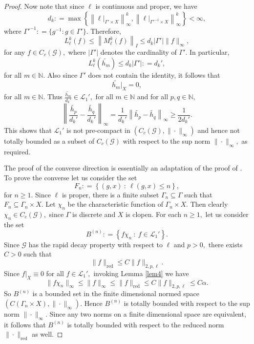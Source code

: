 \documentclass[a4paper,11pt,reqno]{amsart}
\theoremstyle{plain}
\theoremstyle{named}
\numberwithin{equation}{section}
\begin{document}
\begin{proof}
				Now note that since $\ell$ is continuous and proper, we have $$d_k : = \max \left \{\left \|\ell \rvert_{\Gamma' \times X} \right \|_{\infty}^k, \left \|\ell \rvert_{\Gamma'^{-1} \times X} \right \|_{\infty}^k \right \} < \infty,$$ where $\Gamma'^{-1} : = \{g^{-1} : g \in \Gamma' \}.$  Therefore, $$L_{\ell}^{k} (f) \leq \left \|M_{\ell}^{k} (f) \right \|_{I} \leq d_k \left \lvert \Gamma' \right \rvert \|f\|_{\infty},$$ for any $f \in C_c (\mathcal G),$ where $\left \lvert \Gamma' \right \rvert$ denotes the cardinality of $\Gamma'.$ In particular, $$L_{\ell}^{k} \left (\widetilde {h_m} \right ) \leq d_k \left \lvert \Gamma' \right \rvert : = d_k',$$ for all $m \in \mathbb N.$ Also since $\Gamma'$ does not contain the identity, it follows that $$\widetilde {h_m} \big \rvert_{X} = 0,$$ for all $m \in \mathbb N.$ Thus $\frac {\widetilde {h_m}} {d_k'} \in \mathcal L_1',$ for all $m \in \mathbb N$ and for all $p, q \in \mathbb N,$ $$\left \|\frac {\widetilde {h_p}} {d_k'} - \frac {\widetilde {h_q}} {d_k'} \right \|_{\infty} = \frac {1} {d_k'} \left \|\widetilde {h_p} - \widetilde {h_q} \right \|_{\infty} \geq \frac {1} {2d_k'}.$$ This shows that $\mathcal L_1'$ is not pre-compact in $\left (C_c (\mathcal G), \|\cdot\|_{\infty} \right )$ and hence not totally bounded as a subset of $C_c (\mathcal G)$ with respect to the sup 
				norm $\|\cdot\|_{\infty},$ as required.
				
				
				The proof of the converse direction is essentially an adaptation of the proof of \cite[Theorem 3.5]{Long-Wu-2017-Twisted-group-C-alg-as-CQMS}. To prove the converse let us consider the set  
				$$F_n : = \left \{(g, x)\ :\ \ell (g, x) \leq n \right \},$$ for $n \geq 1.$
				Since $\ell$ is proper, there is a finite subset $\Gamma_n \subseteq \Gamma$ such that $F_n \subseteq \Gamma_n \times X.$ Let $\chi_n$ be the characteristic function of $\Gamma_n \times X.$ Then clearly $\chi_n \in C_c (\mathcal G),$ since $\Gamma$ is discrete and $X$ is clopen. For each $n \geq 1,$ let us consider the set
				$$B^{(n)} : = \left \{f \chi_n\ :\ f \in \mathcal L_1' \right \}.$$ Since $\mathcal G$ has the rapid decay property with respect to $\ell$ and $p > 0,$ there exists $C > 0$ such that $$\|f\|_{\mathrm {red}} \leq C \|f\|_{2,p, \ell}.$$ Since $f \rvert_{X} \equiv 0$ for all $f \in \mathcal L_1',$ invoking Lemma \ref{lem4} we have $$\|f \chi_n\|_{\infty} \leq \|f\|_{\infty} \leq \|f\|_{\mathrm {red}} \leq C \|f\|_{2,p, \ell} \leq C \alpha.$$
				 So $B^{(n)}$ is a bounded set in the finite dimensional normed space $\left (C (\Gamma_n \times X), \| \cdot \|_{\infty} \right ).$ Hence $B^{(n)}$ is totally bounded with respect to the sup norm $\|\cdot\|_{\infty}.$ Since any two norms on a finite dimensional space are equivalent, it follows that $B^{(n)}$ is totally bounded with respect to the reduced norm $\|\cdot\|_{\mathrm {red}}$ as well.
				

\end{proof}
\end{document}
